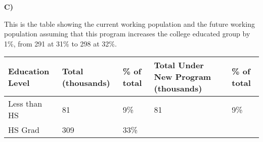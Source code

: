 \documentclass[11pt]{article}
\begin{document}
\textbf{C)}

This is the table showing the current working population and the future
working population assuming that this program increases the college
educated group by 1\%, from 291 at 31\% to 298 at 32\%.

\begin{longtable}[]{@{}lllll@{}}
\toprule
\begin{minipage}[b]{0.21\columnwidth}\raggedright
Education Level\strut
\end{minipage} & \begin{minipage}[b]{0.23\columnwidth}\raggedright
Total (thousands)\strut
\end{minipage} & \begin{minipage}[b]{0.15\columnwidth}\raggedright
\% of total\strut
\end{minipage} & \begin{minipage}[b]{0.15\columnwidth}\raggedright
Total Under New Program (thousands)\strut
\end{minipage} & \begin{minipage}[b]{0.13\columnwidth}\raggedright
\% of total\strut
\end{minipage}\tabularnewline
\midrule
\endhead
\begin{minipage}[t]{0.21\columnwidth}\raggedright
Less than HS\strut
\end{minipage} & \begin{minipage}[t]{0.23\columnwidth}\raggedright
81\strut
\end{minipage} & \begin{minipage}[t]{0.15\columnwidth}\raggedright
9\%\strut
\end{minipage} & \begin{minipage}[t]{0.15\columnwidth}\raggedright
81\strut
\end{minipage} & \begin{minipage}[t]{0.13\columnwidth}\raggedright
9\%\strut
\end{minipage}\tabularnewline
\begin{minipage}[t]{0.21\columnwidth}\raggedright
HS Grad\strut
\end{minipage} & \begin{minipage}[t]{0.23\columnwidth}\raggedright
309\strut
\end{minipage} & \begin{minipage}[t]{0.15\columnwidth}\raggedright
33\%\strut
\end{minipage} & \begin{minipage}[t]{0.15\columnwidth}\raggedright

\end{minipage}
\end{longtable}
\end{document}
